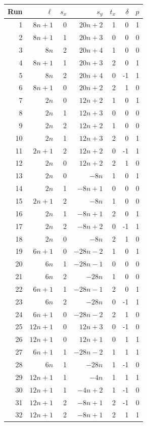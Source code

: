 \begin{longtable}{r r r r r r r}
\toprule
Run & $\ell$ & $s_x$ & $s_y$ & $t_x$ & $\delta$ & $p$\\
\midrule
\endhead
1&$8n+1$&0&$20n+2$&1&0&1\\
2&$8n+1$&1&$20n+3$&0&0&0\\
3&$8n$&2&$20n+4$&1&0&0\\
4&$8n+1$&1&$20n+3$&2&0&1\\
5&$8n$&2&$20n+4$&0&-1&1\\
6&$8n+1$&0&$20n+2$&2&1&0\\
7&$2n$&0&$12n+2$&1&0&1\\
8&$2n$&1&$12n+3$&0&0&0\\
9&$2n$&2&$12n+2$&1&0&0\\
10&$2n$&1&$12n+3$&2&0&1\\
11&$2n+1$&2&$12n+2$&0&-1&1\\
12&$2n$&0&$12n+2$&2&1&0\\
13&$2n$&0&$-8n$&1&0&1\\
14&$2n$&1&$-8n+1$&0&0&0\\
15&$2n+1$&2&$-8n$&1&0&0\\
16&$2n$&1&$-8n+1$&2&0&1\\
17&$2n$&2&$-8n+2$&0&-1&1\\
18&$2n$&0&$-8n$&2&1&0\\
19&$6n+1$&0&$-28n-2$&1&0&1\\
20&$6n$&1&$-28n-1$&0&0&0\\
21&$6n$&2&$-28n$&1&0&0\\
22&$6n+1$&1&$-28n-1$&2&0&1\\
23&$6n$&2&$-28n$&0&-1&1\\
24&$6n+1$&0&$-28n-2$&2&1&0\\
25&$12n+1$&0&$12n+3$&0&-1&0\\
26&$12n+1$&0&$12n+1$&0&1&1\\
27&$6n+1$&1&$-28n-2$&1&1&1\\
28&$6n$&1&$-28n$&1&-1&0\\
29&$12n+1$&1&$-4n$&1&1&1\\
30&$12n+1$&1&$-4n+2$&1&-1&0\\
31&$12n+1$&2&$-8n+1$&2&-1&0\\
32&$12n+1$&2&$-8n+1$&2&1&1\\
\bottomrule
\end{longtable}
